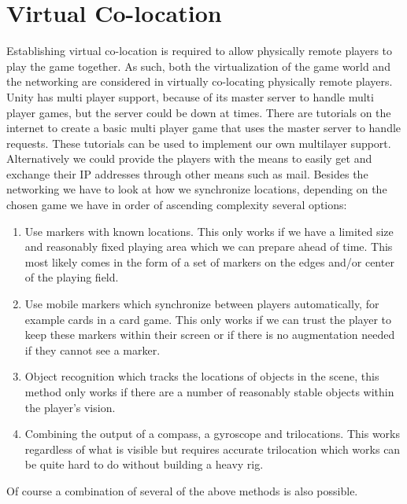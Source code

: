 \section{Virtual Co-location} \label{sec:virtualcolocation}
	Establishing virtual co-location is required to allow physically remote
	players to play the game together. As such, both the virtualization of the
	game world and the networking are considered in virtually co-locating
	physically remote players. Unity has multi player support, because of its
	master server to handle multi player games, but the server could be down at
	times. There are tutorials on the internet to create a basic multi player game
	that uses the master server to handle requests. These tutorials can be used to
	implement our own multilayer support. Alternatively we could provide the
	players with the means to easily get and exchange their IP addresses through
	other means such as mail. Besides the networking we have to look at how we
	synchronize locations, depending on the chosen game we have in order of
	ascending complexity several options:

	\begin{enumerate}
		\item Use markers with known locations. This only works if we have a limited
		      size and reasonably fixed playing area which we can prepare ahead of
					time. This most likely comes in the form of a set of markers on the
					edges and/or center of the playing field.
		\item Use mobile markers which synchronize between players automatically, for
		      example cards in a card game. This only works if we can trust the
					player to keep these markers within their screen or if there is no
					augmentation needed if they cannot see a marker.
		\item Object recognition which tracks the locations of objects in the scene,
		      this method only works if there are a number of reasonably stable
					objects within the player's vision.
		\item Combining the output of a compass, a gyroscope and trilocations. This
		      works regardless of what is visible but requires accurate trilocation
					which works can be quite hard to do without building a heavy rig.
	\end{enumerate}
	Of course a combination of several of the above methods is also possible.

